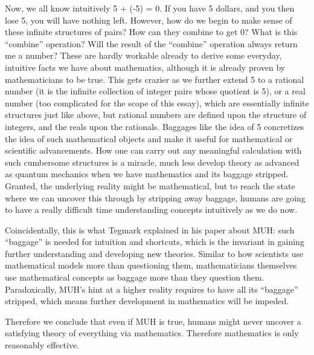 \documentclass[a4paper]{article}
\newcommand{\0}{\{\}}
\newcommand{\1}{\{\0\}}
\newcommand{\2}{\{\0,\1\}}
\newcommand{\3}{\{\0,\1,\2\}}
\newcommand{\4}{\{\0,\1,\2,\3\}}
\newcommand{\5}{\{\0,\1,\2,\3,\4\}}
\begin{document}
Now, we all know intuitively 5 + (-5) = 0. If you have 5 dollars, and you then
lose 5, you will have nothing left. However, how do we begin to make sense of
these infinite structures of pairs? How can they combine to get 0? What is this
“combine” operation? Will the result of the “combine” operation always return me
a number? These are hardly workable already to derive some everyday, intuitive
facts we have about mathematics, although it is already proven by mathematicians
to be true. This gets crazier as we further extend 5 to a rational number (it is
the infinite collection of integer pairs whose quotient is 5), or a real number
(too complicated for the scope of this essay), which are essentially infinite
structures just like above, but rational numbers are defined upon the structure
of integers, and the reals upon the rationals. Baggages like the idea of 5
concretizes the idea of such mathematical objects and make it useful for
mathematical or scientific advancements. How one can carry out any meaningful
calculation with such cumbersome structures is a miracle, much less develop
theory as advanced as quantum mechanics when we have mathematics and its baggage
stripped. Granted, the underlying reality might be mathematical, but to reach
the state where we can uncover this through by stripping away baggage, humans
are going to have a really difficult time understanding concepts intuitively as
we do now.

Coincidentally, this is what Tegmark explained in his paper about MUH: such
“baggage” is needed for intuition and shortcuts, which is the invariant in
gaining further understanding and developing new theories. Similar to how
scientists use mathematical models more than questioning them, mathematicians
themselves use mathematical concepts as baggage more than they question them.
Paradoxically, MUH’s hint at a higher reality requires to have all its “baggage”
stripped, which means further development in mathematics will be impeded.

Therefore we conclude that even if MUH is true, humans might never uncover a
satisfying theory of everything via mathematics. Therefore mathematics is only
reasonably effective.

\printbibliography
\end{document}
